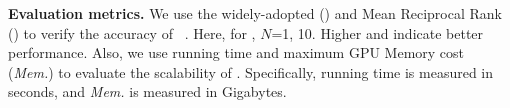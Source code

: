 \noindent
\textbf{Evaluation metrics.}
We use the widely-adopted \HitNFull{} (\HitN{}) and Mean Reciprocal Rank (\MRR{}) to verify the accuracy of \ClusterEA{}~\cite{MTransE17,IPTransE17, GCN-Align18, KECG19, RREA20, DualAMN21, EASY21}. Here, for \HitN{}, $N$=1, 10.
Higher \HitN{} and \MRR{} indicate better performance.
Also, we use running time and maximum GPU Memory cost (\emph{Mem.}) to evaluate the scalability of \ClusterEA{}. Specifically, running time is measured in seconds, and \emph{Mem.} is measured in Gigabytes.

